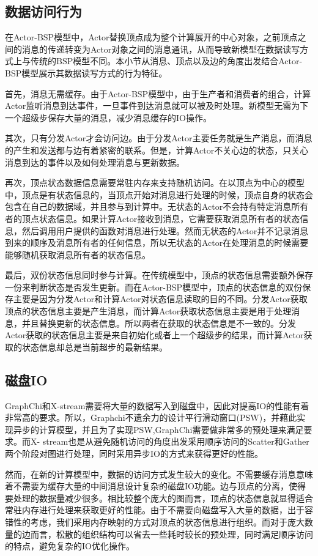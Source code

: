 \subsection{数据访问行为}
在Actor-BSP模型中，Actor替换顶点成为整个计算展开的中心对象，之前顶点之间的消息的传递转变为Actor对象之间的消息通讯，从而导致新模型在数据读写方式上与传统的BSP模型不同。本小节从消息、顶点以及边的角度出发结合Actor-BSP模型展示其数据读写方式的行为特征。

首先，消息无需缓存。由于Actor-BSP模型中，由于生产者和消费者的组合，计算Actor监听消息到达事件，一旦事件到达消息就可以被及时处理。新模型无需为下一个超级步保存大量的消息，减少消息缓存的IO操作。

其次，只有分发Actor才会访问边。由于分发Actor主要任务就是生产消息，而消息的产生和发送都与边有着紧密的联系。但是，计算Actor不关心边的状态，只关心消息到达的事件以及如何处理消息与更新数据。

再次，顶点状态数据信息需要常驻内存来支持随机访问。在以顶点为中心的模型中，顶点是有状态信息的，当顶点开始对消息进行处理的时候，顶点自身的状态会包含在自己的数据域，并且参与到计算中。无状态的Actor不会持有特定消息所有者的顶点状态信息。如果计算Actor接收到消息，它需要获取消息所有者的状态信息，然后调用用户提供的函数对消息进行处理。然而无状态的Actor并不记录消息到来的顺序及消息所有者的任何信息，所以无状态的Actor在处理消息的时候需要能够随机获取消息所有者的状态信息。

最后，双份状态信息同时参与计算。在传统模型中，顶点的状态信息需要额外保存一份来判断状态是否发生更新。而在Actor-BSP模型中，顶点的状态信息的双份保存主要是因为分发Actor和计算Actor对状态信息读取的目的不同。分发Actor获取顶点的状态信息主要是产生消息，而计算Actor获取状态信息主要是用于处理消息，并且替换更新的状态信息。所以两者在获取的状态信息是不一致的。分发Actor获取的状态信息主要是来自初始化或者上一个超级步的结果，而计算Actor获取的状态信息却总是当前超步的最新结果。



\subsection{磁盘IO}
GraphChi和X-stream需要将大量的数据写入到磁盘中，因此对提高IO的性能有着非常高的要求。所以，Graphchi不遗余力的设计平行滑动窗口(PSW)，并藉此实现异步的计算模型，并且为了实现PSW,GraphChi需要做非常多的预处理来满足要求。而X- stream也是从避免随机访问的角度出发采用顺序访问的Scatter和Gather两个阶段对图进行处理，同时采用异步IO的方式来获得更好的性能。

然而，在新的计算模型中，数据的访问方式发生较大的变化。不需要缓存消息意味着不需要为缓存大量的中间消息设计复杂的磁盘IO功能。边与顶点的分离，使得要处理的数据量减少很多。相比较整个庞大的图而言，顶点的状态信息就显得适合常驻内存进行处理来获取更好的性能。由于不需要向磁盘写入大量的数据，出于容错性的考虑，我们采用内存映射的方式对顶点的状态信息进行组织。而对于庞大数量的边而言，松散的组织结构可以省去一些耗时较长的预处理，同时满足顺序访问的特点，避免复杂的IO优化操作。

